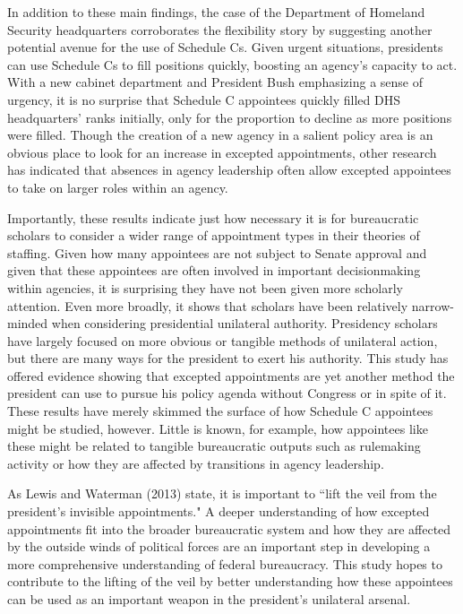\documentclass[12pt]{article}
\begin{document}
In addition to these main findings, the case of the Department of Homeland Security headquarters corroborates the flexibility story by suggesting another potential avenue for the use of Schedule Cs. Given urgent situations, presidents can use Schedule Cs to fill positions quickly, boosting an agency's capacity to act. With a new cabinet department and President Bush emphasizing a sense of urgency, it is no surprise that Schedule C appointees quickly filled DHS headquarters' ranks initially, only for the proportion to decline as more positions were filled. Though the creation of a new agency in a salient policy area is an obvious place to look for an increase in excepted appointments, other research has indicated that absences in agency leadership often allow excepted appointees to take on larger roles within an agency.

Importantly, these results indicate just how necessary it is for bureaucratic scholars to consider a wider range of appointment types in their theories of staffing. Given how many appointees are not subject to Senate approval and given that these appointees are often involved in important decisionmaking within agencies, it is surprising they have not been given more scholarly attention. Even more broadly, it shows that scholars have been relatively narrow-minded when considering presidential unilateral authority. Presidency scholars have largely focused on more obvious or tangible methods of unilateral action, but there are many ways for the president to exert his authority. This study has offered evidence showing that excepted appointments are yet another method the president can use to pursue his policy agenda without Congress or in spite of it. These results have merely skimmed the surface of how Schedule C appointees might be studied, however. Little is known, for example, how appointees like these might be related to tangible bureaucratic outputs such as rulemaking activity or how they are affected by transitions in agency leadership.

As Lewis and Waterman (2013) state, it is important to ``lift the veil from the president's invisible appointments." A deeper understanding of how excepted appointments fit into the broader bureaucratic system and how they are affected by the outside winds of political forces are an important step in developing a more comprehensive understanding of federal bureaucracy. This study hopes to contribute to the lifting of the veil by better understanding how these appointees can be used as an important weapon in the president's unilateral arsenal.
\end{document}
